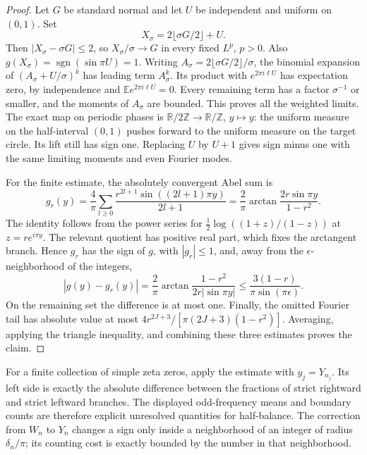 \begin{proof}
Let $G$ be standard normal and let $U$ be independent and uniform
on $(0,1)$. Set
\[
 X_\sigma=2\lfloor\sigma G/2\rfloor+U.
\]
Then $|X_\sigma-\sigma G|\le2$, so
$X_\sigma/\sigma\to G$ in every fixed $L^p$, $p>0$.
Also $g(X_\sigma)=\operatorname{sgn}(\sin\pi U)=1$.
Writing $A_\sigma=2\lfloor\sigma G/2\rfloor/\sigma$, the binomial
expansion of $(A_\sigma+U/\sigma)^k$ has leading term
$A_\sigma^k$. Its product with $e^{2\pi i\ell U}$ has expectation
zero, by independence and $\mathbb E e^{2\pi i\ell U}=0$.
Every remaining term has a factor $\sigma^{-1}$ or smaller,
and the moments of $A_\sigma$ are bounded. This proves all the
weighted limits. The exact map on periodic phases is
$\mathbb R/2\mathbb Z\to\mathbb R/\mathbb Z$, $y\mapsto y$:
the uniform measure on the half-interval $(0,1)$ pushes forward to
the uniform measure on the target circle. Its lift still has sign
one. Replacing $U$ by $U+1$ gives sign minus one with the same
limiting moments and even Fourier modes.

For the finite estimate, the absolutely convergent Abel sum is
\[
 g_r(y)=\frac4\pi\sum_{l\ge0}
       \frac{r^{2l+1}\sin((2l+1)\pi y)}{2l+1}
 =\frac2\pi\arctan\frac{2r\sin\pi y}{1-r^2}.
\]
The identity follows from the power series for
$\tfrac12\log((1+z)/(1-z))$ at $z=re^{i\pi y}$.
The relevant quotient has positive real part, which fixes the
arctangent branch. Hence $g_r$ has the sign of $g$, with
$|g_r|\le1$, and, away from the $\epsilon$-neighborhood of the
integers,
\[
 |g(y)-g_r(y)|
 =\frac2\pi\arctan\frac{1-r^2}{2r|\sin\pi y|}
 \le\frac{3(1-r)}{\pi\sin(\pi\epsilon)}.
\]
On the remaining set the difference is at most one.
Finally, the omitted Fourier tail has absolute value at most
$4r^{2J+3}/[\pi(2J+3)(1-r^2)]$. Averaging, applying the triangle
inequality, and combining these three estimates proves the claim.
\end{proof}

For a finite collection of simple zeta zeros, apply the estimate with
$y_j=Y_{n_j}$. Its left side is exactly the absolute difference
between the fractions of strict rightward and strict leftward
branches. The displayed odd-frequency means and boundary counts
are therefore explicit unresolved quantities for half-balance.
The correction from $W_n$ to $Y_n$ changes a sign only inside a
neighborhood of an integer of radius $\delta_n/\pi$; its counting
cost is exactly bounded by the number in that neighborhood.
